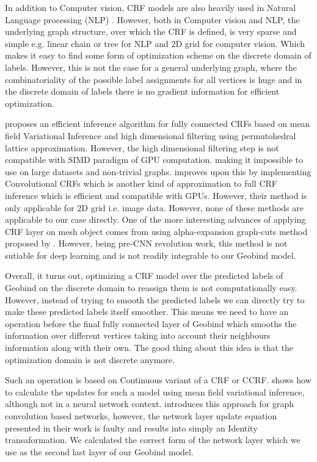 In addition to Computer vision, CRF models are also heavily used in Natural Language processing (NLP)
\citep{roark2004discriminative,mccallum2003early,liu2017identification}. However, both in Computer
vision and NLP, the underlying graph structure, over which the CRF is defined, is very sparse and
simple e.g. linear chain or tree for NLP and 2D grid for computer vision. Which makes it easy to
find some form of optimization scheme on the discrete domain of labels. However, this is not the
case for a general underlying graph, where the combinatoriality of the possible label assignments
for all vertices is huge and in the discrete domain of labels there is no gradient information for
efficient optimization.

\citet{krahenbuhl2012efficient} proposes an efficient inference algorithm for fully connected CRFs
based on mean field Variational Inference and high dimensional filtering using permutohedral lattice
approximation. However, the high dimensional filtering step is not compatible with
SIMD\citep{nickolls2008scalable} paradigm of GPU computation. \citep{teichmann2018convolutional}
making it impossible to use on large datasets and non-trivial graphs.
\citet{teichmann2018convolutional} improves upon this by implementing Convolutional CRFs which is
another kind of approximation to full CRF inference which is efficient and compatible with GPUs.
However, their method is only applicable for 2D grid i.e. image data.  However, none of these methods
are applicable to our case directly. One of the more interesting advances of applying CRF layer on
mesh object comes from \citet{kalogerakis2010learning} using alpha-expansion graph-cuts method proposed by
\citet{boykov2001fast}. However, being pre-CNN revolution work, this method is not sutiable for deep
learning and is not readily integrable to our Geobind model. 
\par
Overall, it turns out, optimizing a CRF model over the predicted labels of Geobind on the discrete
domain to reassign them is not computationally easy. However, instead of trying to smooth the
predicted labels we can directly try to make these predicted labels itself smoother. This means we
need to have an operation before the final fully connected layer of Geobind which smooths the
information over different vertices taking into account their neighbours information along with
their own. The good thing about this idea is that the optimization domain is not discrete anymore.

Such an operation is based on Continuous variant of a CRF or CCRF. \citet{ristovski2013continuous}
shows how to calculate the updates for such a model using mean field variational inference, although
not in a neural network context. \citet{gao2019conditional} introduces this approach for graph
convolution based networks, however, the network layer update equation presented in their work is
faulty and results into simply an Identity transaformation. We calculated the correct
form of the network layer which we use as the second last layer of our Geobind model.

